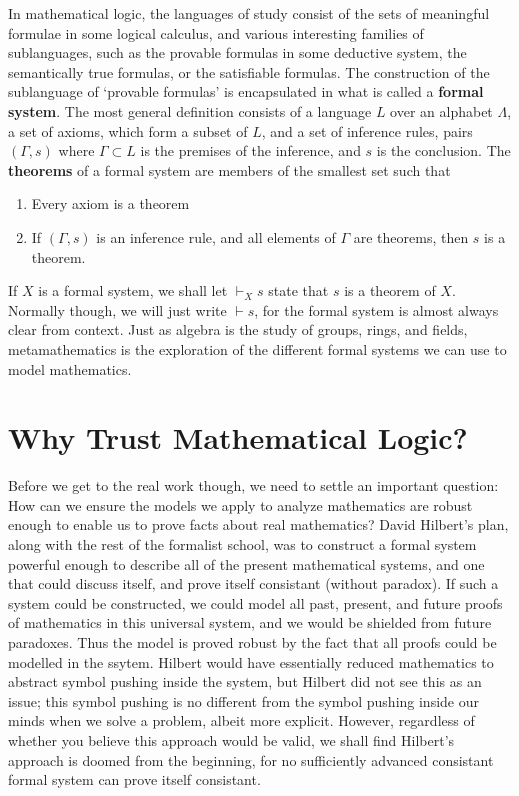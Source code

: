 In mathematical logic, the languages of study consist of the sets of meaningful formulae in some logical calculus, and various interesting families of sublanguages, such as the provable formulas in some deductive system, the semantically true formulas, or the satisfiable formulas. The construction of the sublanguage of `provable formulas' is encapsulated in what is called a {\bf formal system}. The most general definition consists of a language $L$ over an alphabet $\Lambda$, a set of axioms, which form a subset of $L$, and a set of inference rules, pairs $(\Gamma, s)$ where $\Gamma \subset L$ is the premises of the inference, and $s$ is the conclusion. The {\bf theorems} of a formal system are members of the smallest set such that
%
\begin{enumerate}
    \item Every axiom is a theorem
    \item If $(\Gamma, s)$ is an inference rule, and all elements of $\Gamma$ are theorems, then $s$ is a theorem.
\end{enumerate}
%
If $X$ is a formal system, we shall let $\vdash_X s$ state that $s$ is a theorem of $X$. Normally though, we will just write $\vdash s$, for the formal system is almost always clear from context. Just as algebra is the study of groups, rings, and fields, metamathematics is the exploration of the different formal systems we can use to model mathematics.

\section{Why Trust Mathematical Logic?}

Before we get to the real work though, we need to settle an important question: How can we ensure the models we apply to analyze mathematics are robust enough to enable us to prove facts about real mathematics? David Hilbert's plan, along with the rest of the formalist school, was to construct a formal system powerful enough to describe all of the present mathematical systems, and one that could discuss itself, and prove itself consistant (without paradox). If such a system could be constructed, we could model all past, present, and future proofs of mathematics in this universal system, and we would be shielded from future paradoxes. Thus the model is proved robust by the fact that all proofs could be modelled in the ssytem. Hilbert would have essentially reduced mathematics to abstract symbol pushing inside the system, but Hilbert did not see this as an issue; this symbol pushing is no different from the symbol pushing inside our minds when we solve a problem, albeit more explicit. However, regardless of whether you believe this approach would be valid, we shall find Hilbert's approach is doomed from the beginning, for no sufficiently advanced consistant formal system can prove itself consistant.

